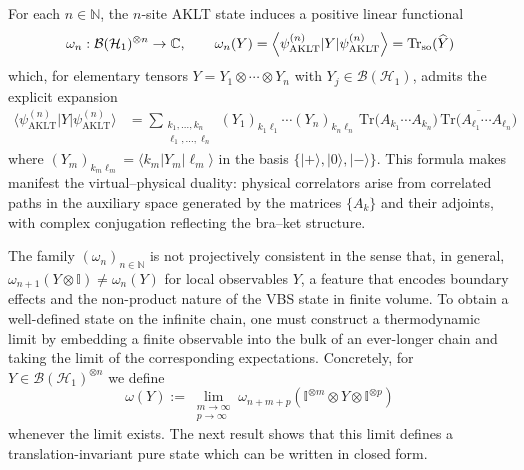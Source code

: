 \documentclass[11pt,a4paper]{article}
\def\Tr{\mathrm{Tr}}
\begin{document}
  For each $n\in\mathbb{N}$, the $n$‑site AKLT state induces a positive linear functional
\[
\omega_n:\mathcal{B}(\mathcal{H}_{1})^{\otimes n}\to\mathbb{C},
\qquad
\omega_n(Y)
=
 \Bigl\langle\psi_{\mathrm{AKLT}}^{(n)}|Y|\psi_{\mathrm{AKLT}}^{(n)}\Bigr\rangle = \operatorname{Tr}_{\mathrm{so}}(\widehat{Y})
\]
which, for elementary tensors $Y = Y_1\otimes\cdots\otimes Y_n$ with $Y_j\in\mathcal{B}(\mathcal{H}_{1})$, admits the explicit expansion
\begin{eqnarray*}
\langle\psi_{\mathrm{AKLT}}^{(n)}|Y|\psi_{\mathrm{AKLT}}^{(n)}\rangle &=
\sum_{\substack{k_1,\dots,k_n\\ \ell_1,\dots,\ell_n}}
(Y_1)_{k_1\ell_1}\cdots(Y_n)_{k_n\ell_n}\,
\Tr\!\bigl(A_{k_1}\cdots A_{k_n}\bigr)\,
\overline{\Tr\!\bigl(A_{\ell_1}\cdots A_{\ell_n}\bigr)}
\end{eqnarray*}
where $(Y_m)_{k_m\ell_m}=\langle k_m|Y_m|\ell_m\rangle$ in the basis $\{|+\rangle,|0\rangle,|-\rangle\}$. This formula makes manifest the virtual–physical duality: physical correlators arise from correlated paths in the auxiliary space generated by the matrices $\{A_k\}$ and their adjoints, with complex conjugation reflecting the bra–ket structure.

The family $(\omega_n)_{n\in\mathbb{N}}$ is not projectively consistent in the sense that, in general, $\omega_{n+1}(Y\otimes\mathbb{I})\neq\omega_n(Y)$ for local observables $Y$, a feature that encodes boundary effects and the non-product nature of the VBS state in finite volume. To obtain a well-defined state on the infinite chain, one must construct a thermodynamic limit by embedding a finite observable into the bulk of an ever-longer chain and taking the limit of the corresponding expectations. Concretely, for $Y\in\mathcal{B}(\mathcal{H}_{1})^{\otimes n}$ we define
\begin{equation}\label{omega_AKLT_limit}
\omega(Y)
:=
\lim_{\substack{m\to\infty\\ p\to\infty}} \omega_{n+m+p}(\mathbb{I}^{\otimes m}\otimes Y\otimes\mathbb{I}^{\otimes p})
\end{equation}
whenever the limit exists. The next result shows that this limit defines a translation-invariant pure state which can be written in closed form.
\end{document}
